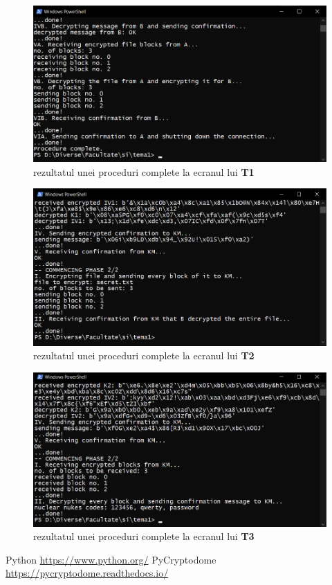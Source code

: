 \documentclass{article}
\begin{document}
\begin{center}
\begin{figure}[h!]
\includegraphics[scale=0.7]{5.jpg}
\caption{rezultatul unei proceduri complete la ecranul lui \textbf{T1}}
\end{figure}
\begin{figure}[h!]
\includegraphics[scale=0.7]{6.jpg}
\caption{rezultatul unei proceduri complete la ecranul lui \textbf{T2}}
\end{figure}
\newpage
\begin{figure}[h!]
\includegraphics[scale=0.7]{7.jpg}
\caption{rezultatul unei proceduri complete la ecranul lui \textbf{T3}}
\end{figure}
\end{center}


\begin{thebibliography}{9}
Python
\url{https://www.python.org/}
PyCryptodome
\url{https://pycryptodome.readthedocs.io/}
\end{thebibliography}  
\end{document}

